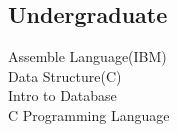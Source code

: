 \documentclass[a4paper]{lyu-resume} %
\begin{document}
\begin{minipage}[t]{0.33\textwidth}
\subsection{Undergraduate}

Assemble Language(IBM) \\
Data Structure(C) \\
Intro to Database \\
C Programming Language

\sectionspace %


\end{minipage} %
\hfill
%
%
\end{document}
